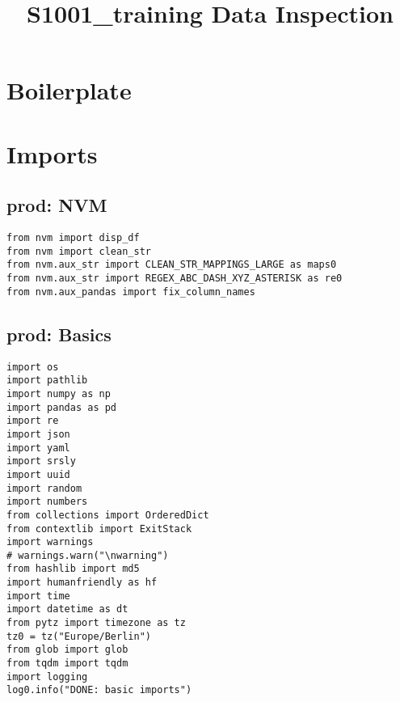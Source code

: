 \documentclass[a4paper,10pt,onecolumn,oneside,openright]{article}
\date{}
\title{S1001\_training Data Inspection}
\begin{document}
\maketitle


\section{Boilerplate}
\label{sec:orgf5fa2f6}
\section{Imports}
\label{sec:orgf65ee82}
\subsection{prod: NVM}
\label{sec:orga834d1b}
\begin{verbatim}
from nvm import disp_df
from nvm import clean_str
from nvm.aux_str import CLEAN_STR_MAPPINGS_LARGE as maps0
from nvm.aux_str import REGEX_ABC_DASH_XYZ_ASTERISK as re0
from nvm.aux_pandas import fix_column_names
\end{verbatim}

\subsection{prod: Basics}
\label{sec:org1b17c7a}
\begin{verbatim}
import os
import pathlib
import numpy as np
import pandas as pd
import re
import json
import yaml
import srsly
import uuid
import random
import numbers
from collections import OrderedDict
from contextlib import ExitStack
import warnings
# warnings.warn("\nwarning")
from hashlib import md5
import humanfriendly as hf
import time
import datetime as dt
from pytz import timezone as tz
tz0 = tz("Europe/Berlin")
from glob import glob
from tqdm import tqdm
import logging
log0.info("DONE: basic imports")
\end{verbatim}
\end{document}
